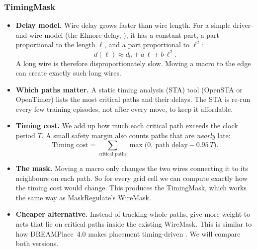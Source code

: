 \documentclass{article}
\begin{document}
\subsubsection{TimingMask}
\begin{itemize}
  \item \textbf{Delay model.} Wire delay grows faster than wire length. For a simple driver-and-wire
  model (the Elmore delay, \citealp{elmore1948transient}), it has a constant part, a part proportional
  to the length $\ell$, and a part proportional to $\ell^2$:
  \begin{equation}
  d(\ell)\approx d_0+a\,\ell+b\,\ell^2 .
  \end{equation}
  A long wire is therefore disproportionately slow. Moving a macro to the edge can create exactly such
  long wires.
  \item \textbf{Which paths matter.} A static timing analysis (STA) tool (OpenSTA or OpenTimer) lists
  the most critical paths and their delays. The STA is re-run every few training episodes, not after
  every move, to keep it affordable.
  \item \textbf{Timing cost.} We add up how much each critical path exceeds the clock period $T$. A small
  safety margin also counts paths that are \emph{nearly} late:
  \begin{equation}
  \text{Timing cost}=\sum_{\text{critical paths}}\max\big(0,\ \text{path delay}-0.95\,T\big).
  \end{equation}
  \item \textbf{The mask.} Moving a macro only changes the two wires connecting it to its neighbours on
  each path. So for every grid cell we can compute exactly how the timing cost would change. This
  produces the TimingMask, which works the same way as MaskRegulate's WireMask.
  \item \textbf{Cheaper alternative.} Instead of tracking whole paths, give more weight to nets that lie
  on critical paths inside the existing WireMask. This is similar to how DREAMPlace~4.0 makes
  placement timing-driven \citep{liao2023dreamplace4}. We will compare both versions.
\end{itemize}
\end{document}
